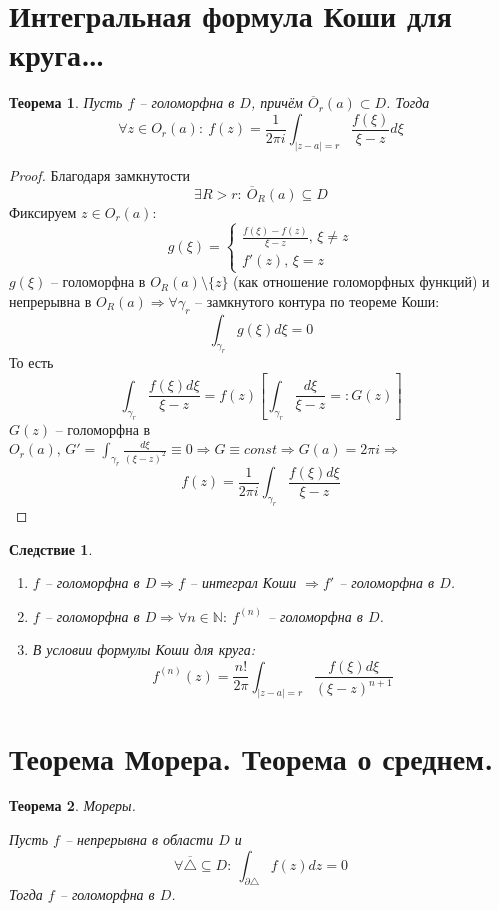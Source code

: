 \documentclass[a4paper,12pt]{article}
\theoremstyle{plain}
\newtheorem{theorem}{Теорема}[section]
\newtheorem*{corollary}{Следствие}
\theoremstyle{definition}
\theoremstyle{remark}
\begin{document}
\section{Интегральная формула Коши для круга\dots}
\begin{theorem}
	Пусть $f$ -- голоморфна в $D$, причём $\overline{O}_r(a) \subset D$. Тогда
	\[
		\forall z \in O_r(a) :\: f(z) = \frac{1}{2\pi i} \int_{\vert z - a\vert = r}\frac{f(\xi)}{\xi - z}d\xi
	\]
\end{theorem}

\begin{proof}
	Благодаря замкнутости
	\[
		\exists R > r :\: \overline{O}_R(a) \subseteq D
	\]
	Фиксируем $z \in O_r(a)$:
	\[
		g(\xi) = \begin{cases}
			\frac{f(\xi) - f(z)}{\xi - z},\, \xi \neq z \\
			f'(z),\, \xi = z
		\end{cases}
	\]
	$g(\xi)$ -- голоморфна в $O_R(a) \setminus \{z\}$ (как отношение голоморфных функций) и непрерывна в $O_R(a) \Rightarrow \forall \gamma_r$ -- замкнутого контура по теореме Коши:
	\[
		\int_{\gamma_r}g(\xi)d\xi = 0
	\]
	То есть
	\[
		\int_{\gamma_r}\frac{f(\xi)d\xi}{\xi - z} = f(z)\left[\int_{\gamma_r}\frac{d\xi}{\xi - z} =: G(z)\right]
	\]
	$G(z)$ -- голоморфна в $O_r(a),\, G' = \int_{\gamma_r} \frac{d\xi}{(\xi - z)^2} \equiv 0 \Rightarrow G \equiv const \Rightarrow G(a) = 2\pi i \Rightarrow$
	\[
		f(z) = \frac{1}{2\pi i} \int_{\gamma_r}\frac{f(\xi)d\xi}{\xi - z}
	\]
\end{proof}

\begin{corollary}
	\begin{enumerate}
		\item $f$ -- голоморфна в $D \Rightarrow f$ -- интеграл Коши $\Rightarrow f'$ -- голоморфна в $D$.
		\item $f$ -- голоморфна в $D \Rightarrow \forall n \in \mathbb{N} :\: f^{(n)}$ -- голоморфна в $D$.
		\item В условии формулы Коши для круга:
		      \begin{equation}\label{nElem}
			      f^{(n)}(z) = \frac{n!}{2\pi} \int_{\vert z - a\vert = r} \frac{f(\xi)d\xi}{(\xi - z)^{n + 1}}
		      \end{equation}
	\end{enumerate}
\end{corollary}

\section{Теорема Морера. Теорема о среднем.}
\begin{theorem}
	Мореры.

	Пусть $f$ -- непрерывна в области $D$ и
	\[
		\forall \overline{\triangle} \subseteq D :\: \int_{\partial \triangle} f(z)dz = 0
	\]
	Тогда $f$ -- голоморфна в $D$.
\end{theorem}
\end{document}
